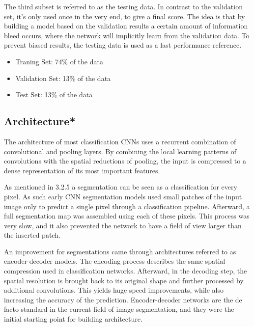 The third subset is referred to as the testing data. In contrast to the validation set, it's only used once in the very end, to give a final score. The idea is that by building a model based on the validation results a certain amount of information bleed occurs, where the network will implicitly learn from the validation data. To prevent biased results, the testing data is used as a last performance reference.

\begin{itemize}
\item Traning Set: 74\% of the data
\item Validation Set: 13\% of the data
\item Test Set: 13\% of the data
\end{itemize}

\subsection{Architecture*}

The architecture of most classification CNNs uses a recurrent combination of convolutional and pooling layers. By combining the local learning patterns of convolutions with the spatial reductions of pooling, the input is compressed to a dense representation of its most important features.

As mentioned in 3.2.5 a segmentation can be seen as a classification for every pixel. As such early CNN segmentation models used small patches of the input image only to predict a single pixel through a classification pipeline. Afterward, a full segmentation map was assembled using each of these pixels. This process was very slow, and it also prevented the network to have a field of view larger than the inserted patch.

An improvement for segmentations came through architectures referred to as encoder-decoder models. The encoding process describes the same spatial compression used in classification networks. Afterward, in the decoding step, the spatial resolution is brought back to its original shape and further processed by additional convolutions. This yields huge speed improvements, while also increasing the accuracy of the prediction. Encoder-decoder networks are the de facto standard in the current field of image segmentation, and they were the initial starting point for building architecture.

